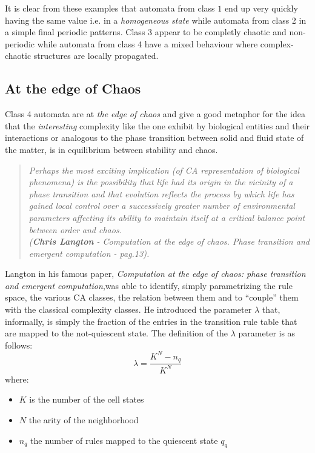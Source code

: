 It is clear from these examples that automata from class $1$ end up very quickly having the same value i.e. in a \textit{homogeneous state} while automata
from class 2 in a simple final periodic patterns.
Class 3 appear to be completly chaotic and non-periodic while automata from class 4 have
a mixed behaviour where complex-chaotic structures are locally propagated.
\subsection{At the edge of Chaos}
Class 4 automata are at \emph{the edge of chaos} and give a good metaphor for
the idea that the \textit{interesting} complexity like the one exhibit by
biological entities and their interactions or analogous to the phase transition
between solid and fluid state of the matter, is in equilibrium between
stability and chaos\cite{Langton1990}.
\begin{quotation}
\em Perhaps the most exciting implication (of CA representation of biological
phenomena) is the possibility that life had its origin in the vicinity of a
phase transition and that evolution reflects the process by which life has
gained local control over a successively greater number of environmental
parameters affecting its ability to maintain itself at a critical balance point
between order and chaos.\\
(\textit{\textbf{Chris Langton} - Computation at the edge of chaos.
Phase transition and emergent computation - pag.13}).
\end{quotation}


Langton in his famous paper, \textit{Computation at the edge of chaos: phase
transition and emergent computation}\cite{Langton1990},was able to
identify, simply parametrizing the rule space, the various CA classes, the
relation between them and to ``couple'' them with the classical complexity classes.
He introduced the parameter $\lambda$\cite{LangtonThesis1990} that, informally, is simply
the fraction of the entries in the transition rule table that are mapped to the
not-quiescent state.
The definition of the $\lambda$ parameter is as follows:
\[\lambda=\frac{K^N-n_q}{K^N}\]
where:
\begin{itemize}
  \item $K$ is the number of the cell states
  \item $N$ the arity of the neighborhood
  \item $n_q$ the number of rules mapped to the quiescent
  state $q_q$
\end{itemize}

